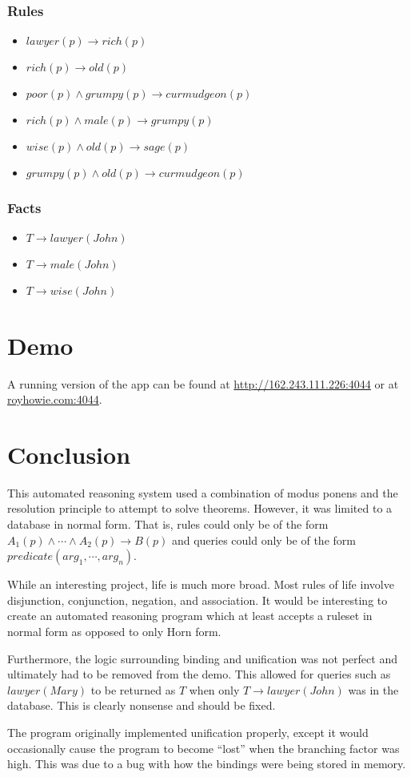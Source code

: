 \documentclass{article}
\begin{document}
    \subsubsection{Rules}
      \begin{itemize}
        \item $lawyer(p)\rightarrow rich(p)$
        \item $rich(p)\rightarrow old(p)$
        \item $poor(p)\wedge grumpy(p)\rightarrow curmudgeon(p)$
        \item $rich(p)\wedge male(p)\rightarrow grumpy(p)$
        \item $wise(p)\wedge old(p)\rightarrow sage(p)$
        \item $grumpy(p)\wedge old(p)\rightarrow curmudgeon(p)$
      \end{itemize}
    \subsubsection{Facts}
      \begin{itemize}
        \item $T\rightarrow lawyer(John)$
        \item $T\rightarrow male(John)$
        \item $T\rightarrow wise(John)$
      \end{itemize}

\section{Demo}
  A running version of the app can be found at \url{http://162.243.111.226:4044}
  or at \url{royhowie.com:4044}.

\section{Conclusion}
  This automated reasoning system used a combination of modus ponens and the
  resolution principle to attempt to solve theorems. However, it was limited to
  a database in normal form. That is, rules could only be of the form
  $A_1(p)\wedge\cdots\wedge A_2(p)\rightarrow B(p)$ and queries could only be of
  the form $predicate(arg_1,\cdots,arg_n)$.

  While an interesting project, life is much more broad. Most rules of life
  involve disjunction, conjunction, negation, and association. It would be
  interesting to create an automated reasoning program which at least accepts
  a ruleset in normal form as opposed to only Horn form.

  Furthermore, the logic surrounding binding and unification was not perfect and
  ultimately had to be removed from the demo. This allowed for queries such as
  $lawyer(Mary)$ to be returned as $T$ when only $T\rightarrow lawyer(John)$ was
  in the database. This is clearly nonsense and should be fixed.

  The program originally implemented unification properly, except it would
  occasionally cause the program to become ``lost'' when the branching factor
  was high. This was due to a bug with how the bindings were being stored in
  memory.
\end{document}
